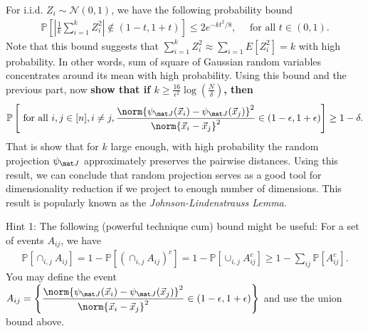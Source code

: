 \documentclass[preview]{standalone}
\begin{document}
\begin{Parts}
\Part 

For i.i.d. $Z_i \sim \mathcal{N}(0, 1)$, we
have the following probability bound
\begin{align*}
	\mathbb{P}\left[ \left\vert\frac{1}{k}\sum_{i=1}^k Z_i^2\right\vert \notin (1-t, 1+t) \right] \leq 2e^{-kt^2/8}, 
	\quad \text{ for all } t \in (0, 1).
\end{align*}
Note that this bound suggests that $\sum_{i=1}^k Z_i^2 \approx \sum_{i=1}E[Z_i^2] = k$ with high probability.
In other words, sum of square of Gaussian random variables concentrates around its mean with high probability.
Using this bound and the previous part, now {\bf show that if 
$k \geq \frac{16}{\epsilon^2} \log\left(\frac{N}{\delta}\right)$, then }
\begin{align*}
	\mathbb{P}\left[ \text{ for all } i, j \in [\num], i\neq j, 
	\frac{\norm{\psi_{\mat J}(\vec x_i) - \psi_{\mat J}(\vec x_j)}^2}{\norm{\vec x_i - \vec x_j}^2} \in (1-\epsilon, 1+\epsilon) \right] 
	\geq 1-\delta.
\end{align*}
That is show that for $k$ large enough, with high probability the random projection
$\psi_{\mat J}$ approximately preserves the pairwise distances.
Using this result, we can conclude that random projection serves as a good tool for dimensionality reduction 
if we project to enough number of dimensions.
This result is popularly known as the \emph{Johnson-Lindenstrauss Lemma}.

Hint 1: The following (powerful technique cum) bound might be useful:
For a set of events ${A_{ij}}$, we have
\begin{align*}
	\mathbb{P}\left[ \cap_{i, j} A_{ij} \right]
	= 1- \mathbb{P}\left[ (\cap_{i, j} A_{ij})^c\right] 
	= 1 - \mathbb{P}\left[ \cup_{i, j} A_{ij}^c\right] 
	\geq 1 - \sum_{ij} \mathbb{P}\left[ A_{ij}^c\right].
\end{align*}
You may define the event 
$A_{ij} = \left\{\displaystyle\frac{\norm{\psi_{\mat J}(\vec x_i) - \psi_{\mat J}(\vec x_j)}^2}{\norm{\vec x_i - \vec x_j}^2} \in (1-\epsilon, 1+\epsilon) \right\}$
and use the union bound above.




\end{Parts}
\end{document}
